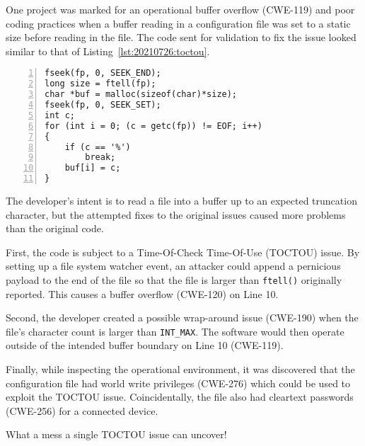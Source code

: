 One project was marked for an operational buffer overflow (CWE-119) and poor coding practices when a buffer reading in a configuration file was set to a static size before reading in the file. The code sent for validation to fix the issue looked similar to that of Listing~\ref{lst:20210726:toctou}.

\begin{lstlisting}[caption={Overflows and TOCTOUs},captionpos=b,style=CStyle,basicstyle=\small,label={lst:20210726:toctou},numbers=left,stepnumber=1]
fseek(fp, 0, SEEK_END);
long size = ftell(fp);
char *buf = malloc(sizeof(char)*size);
fseek(fp, 0, SEEK_SET);
int c;
for (int i = 0; (c = getc(fp)) != EOF; i++)
{
	if (c == '%')
		break;
	buf[i] = c;
}
\end{lstlisting}

The developer's intent is to read a file into a buffer up to an expected truncation character, but the attempted fixes to the original issues caused more problems than the original code.

First, the code is subject to a Time-Of-Check Time-Of-Use (TOCTOU) issue. By setting up a file system watcher event, an attacker could append a pernicious payload to the end of the file so that the file is larger than \texttt{ftell()} originally reported. This causes a buffer overflow (CWE-120) on Line 10.

Second, the developer created a possible wrap-around issue (CWE-190) when the file's character count is larger than \texttt{INT\_MAX}. The software would then operate outside of the intended buffer boundary on Line 10 (CWE-119).

Finally, while inspecting the operational environment, it was discovered that the configuration file had world write privileges (CWE-276) which could be used to exploit the TOCTOU issue. Coincidentally, the file also had cleartext passwords (CWE-256) for a connected device.

What a mess a single TOCTOU issue can uncover!
